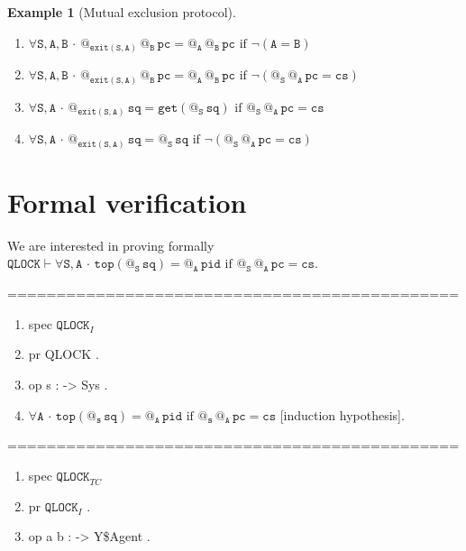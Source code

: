 \documentclass{article}
\makeatletter
\newcommand{\B}{\mathtt{B}}
\newcommand{\A}{\mathtt{A}}
\renewcommand{\S}{\mathtt{S}}
\newcommand{\s}{{\mathtt{s}}}
\newcommand{\pc}{{\mathtt{pc}}}
\newcommand{\pid}{{\mathtt{pid}}}
\newcommand{\sq}{{\mathtt{sq}}}
\newcommand{\cs}{{\mathtt{cs}}}
\newcommand{\QLOCK}{{\mathtt{QLOCK}}}
\newcommand{\Top}{{\mathtt{top}}}
\newcommand{\exit}{{\mathtt{exit}}}
\newcommand{\get}{{\mathtt{get}}}
\newcommand{\at}[1]{@_{#1}\,}
\newcommand{\Forall}[1]{\forall #1\,{\cdot}\,}
\newtheorem{example}{Example}
\newcounter{nr}
\makeatother
\begin{document}
\begin{example} [Mutual exclusion protocol]
\begin{enumerate}[label=(\arabic*),ref=\arabic*, leftmargin=*]
 \item \label{sen-16}$\Forall{\S, \A,\B}  \at{\exit(\S,\A) }\at{\B}\pc =  \at{\A }\at{\B}\pc \text{ if } \neg(\A = \B)$
 
 \item \label{sen-17}$\Forall{\S, \A,\B}  \at{\exit(\S,\A) }\at{\B}\pc =  \at{\A }\at{\B}\pc \text{ if } \neg(\at{\S} \at{\A} \pc = \cs)$
 
 \item \label{sen-18}$\Forall{\S,\A} \at{\exit(\S,\A)}\sq = \get (\at{\S}\sq) \text{ if } \at{\S}\at{\A} \pc = \cs$
 
  \item \label{sen-19}$\Forall{\S,\A} \at{\exit(\S,\A)}\sq = \at{\S}\sq \text{ if } \neg(\at{\S}\at{\A} \pc = \cs)$
  \setcounter{nr}{\value{enumi}}
 \end{enumerate}
 
 \end{example}

\section{Formal verification}

We are interested in proving formally 
 $\QLOCK\vdash\Forall{\S,\A}\Top(\at{\S}\sq)=\at{\A}\pid\text{ if } \at{\S}\at{\A}\pc=\cs$.
 
 ==============================================
   \begin{enumerate}[label=(\arabic*),ref=\arabic*,leftmargin=*] \tt
   \setcounter{enumi}{\value{nr}}
   \item [] spec $\QLOCK_I$
   
   \item [] pr QLOCK .
   
   \item [] op s : -> Sys .
   
   \setcounter{enumi}{\value{nr}}
   \item  $\Forall{\A}\Top(\at{\s}\sq)=\at{\A}\pid\text{ if } \at{\s}\at{\A}\pc=\cs$ [induction hypothesis].
   \setcounter{nr}{\value{enumi}}
   \end{enumerate}
  
  ==============================================
  \begin{enumerate}[label=(\arabic*),ref=\arabic*,leftmargin=*] \tt
   \setcounter{enumi}{\value{nr}} 
   
    \item[] spec $\QLOCK_{TC}$
    
    \item[] pr $\QLOCK_I$ .
    
    \item[] op a b : -> Y\$Agent . 
    
   \end{enumerate}
   
\end{document}
